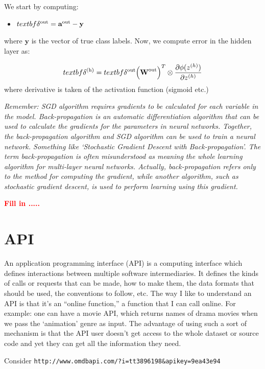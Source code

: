 \documentclass[11pt]{article}
\newcommand{\TODO}[1]{\textcolor{red}{\textbf{#1}}}
\begin{document}
We start by computing:

\begin{itemize}
\item $textbf \delta^{\rm{out}}  = \textbf{a}^{\rm{out}} - \textbf{y}$
\end{itemize}
where $\textbf{y}$ is the vector of true class labels. Now, we compute error in the hidden layer as:


\begin{equation}
textbf{\delta}^{\rm{(h)}} = textbf{\delta}^{\rm{out}} \Big( \textbf{W}^{\rm{out}}\Big)^{T} \otimes \frac{\partial \phi(z^{(h)})}{\partial z^{(h)}}  
\end{equation}
where derivative is taken of the activation function (sigmoid etc.)  

\emph{Remember: SGD algorithm requires gradients to be calculated for 
each variable in the model. Back-propagation is an automatic differentiation 
algorithm that can be used to calculate the gradients for the parameters in neural networks.
Together, the back-propagation algorithm and SGD algorithm 
can be used to train a neural network. Something like
`Stochastic Gradient Descent with Back-propagation'. 
The term back-propagation is often misunderstood as meaning the whole learning algorithm 
for multi-layer neural networks. 
Actually, back-propagation refers only to the method for computing the gradient, 
while another algorithm, such as stochastic gradient descent, 
is used to perform learning using this gradient.} 


\TODO{Fill in .....} 


\section{API} 

An application programming interface (API) is a computing interface 
which defines interactions between multiple software intermediaries. 
It defines the kinds of calls or requests that can be made, how to make them, the data formats that should be used, the conventions to follow, etc.
The way I like to understand an API is that it’s an “online function,” a function that I can call online.
For example: one can have a movie API, which returns names of drama movies when we pass the `animation' genre as input.
The advantage of using such a sort of mechanism is that the API user doesn’t get access to the whole dataset or source code 
and yet they can get all the information they need. 

Consider \texttt{http://www.omdbapi.com/?i=tt3896198\&apikey=9ea43e94} 
\end{document}
